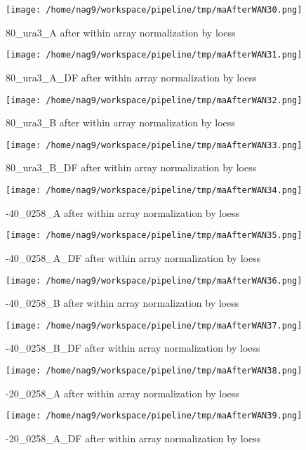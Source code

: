\documentclass[titlepage]{article}
\begin{document}
\begin{figure}[htb!]
\centering\texttt{[image: /home/nag9/workspace/pipeline/tmp/maAfterWAN30.png]}
\caption{80\_ura3\_A after within array normalization by loess}
 \end{figure}\pagebreak
\begin{figure}[htb!]
\centering\texttt{[image: /home/nag9/workspace/pipeline/tmp/maAfterWAN31.png]}
\caption{80\_ura3\_A\_DF after within array normalization by loess}
 \end{figure}\pagebreak
\begin{figure}[htb!]
\centering\texttt{[image: /home/nag9/workspace/pipeline/tmp/maAfterWAN32.png]}
\caption{80\_ura3\_B after within array normalization by loess}
 \end{figure}\pagebreak
\begin{figure}[htb!]
\centering\texttt{[image: /home/nag9/workspace/pipeline/tmp/maAfterWAN33.png]}
\caption{80\_ura3\_B\_DF after within array normalization by loess}
 \end{figure}\pagebreak
\begin{figure}[htb!]
\centering\texttt{[image: /home/nag9/workspace/pipeline/tmp/maAfterWAN34.png]}
\caption{-40\_0258\_A after within array normalization by loess}
 \end{figure}\pagebreak
\begin{figure}[htb!]
\centering\texttt{[image: /home/nag9/workspace/pipeline/tmp/maAfterWAN35.png]}
\caption{-40\_0258\_A\_DF after within array normalization by loess}
 \end{figure}\pagebreak
\begin{figure}[htb!]
\centering\texttt{[image: /home/nag9/workspace/pipeline/tmp/maAfterWAN36.png]}
\caption{-40\_0258\_B after within array normalization by loess}
 \end{figure}\pagebreak
\begin{figure}[htb!]
\centering\texttt{[image: /home/nag9/workspace/pipeline/tmp/maAfterWAN37.png]}
\caption{-40\_0258\_B\_DF after within array normalization by loess}
 \end{figure}\pagebreak
\begin{figure}[htb!]
\centering\texttt{[image: /home/nag9/workspace/pipeline/tmp/maAfterWAN38.png]}
\caption{-20\_0258\_A after within array normalization by loess}
 \end{figure}\pagebreak
\begin{figure}[htb!]
\centering\texttt{[image: /home/nag9/workspace/pipeline/tmp/maAfterWAN39.png]}
\caption{-20\_0258\_A\_DF after within array normalization by loess}
 \end{figure}\pagebreak
\end{document}

